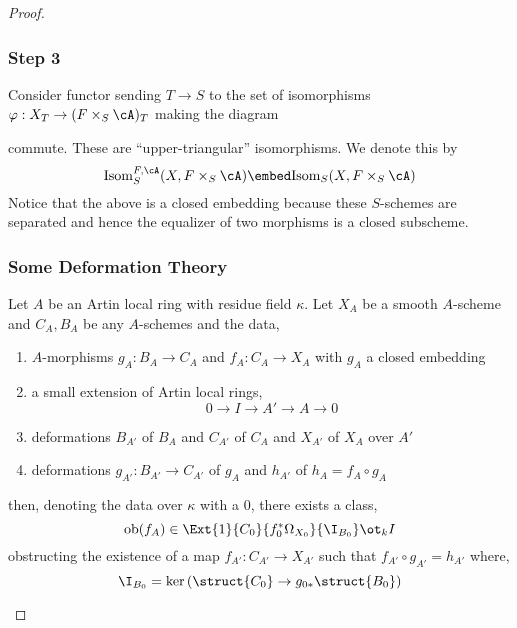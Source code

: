 \documentclass[12pt]{article}
\newcommand{\ob}{\mathrm{ob}}
\begin{document}
\begin{proof}
\subsubsection{Step 3}

Consider functor sending $T \to S$ to the set of isomorphisms $\varphi : X_T \to (F \times_S \cA)_T$ making the diagram
\begin{center}
\end{center}
commute.
These are ``upper-triangular'' isomorphisms. We denote this by
\[ \Isom^{F,\cA}_S(X, F \times_S \cA) \embed \Isom_S(X, F \times_S \cA) \]
Notice that the above is a closed embedding because these $S$-schemes are separated and hence the equalizer of two morphisms is a closed subscheme. 

\subsubsection{Some Deformation Theory}


\begin{lemma} \label{def_theory}
Let $A$ be an Artin local ring with residue field $\kappa$. Let $X_A$ be a smooth $A$-scheme and $C_A, B_A$ be any $A$-schemes and the data,
\begin{enumerate}
\item $A$-morphisms $g_A : B_A \to C_A$ and $f_A : C_A \to X_A$ with $g_A$ a closed embedding

\item a small extension of Artin local rings,
\[ 0 \to I \to A' \to A \to 0 \]

\item deformations $B_{A'}$ of $B_A$ and $C_{A'}$ of $C_A$ and $X_{A'}$ of $X_A$ over $A'$

\item deformations $g_{A'} : B_{A'} \to C_{A'}$ of $g_A$ and $h_{A'}$ of $h_{A} = f_A \circ g_A$
\end{enumerate}
then, denoting the data over $\kappa$ with a $0$, there exists a class,
\[ \ob(f_A) \in \Ext{1}{C_0}{f_0^* \Omega_{X_0}}{\I_{B_0}} \ot_k I \]
obstructing the existence of a map $f_{A'} : C_{A'} \to X_{A'}$ such that $f_{A'} \circ g_{A'} = h_{A'}$ where,
\[ \I_{B_0} = \ker{(\struct{C_0} \to g_{0*} \struct{B_0})} \]
\end{lemma}


\end{proof}
\end{document}
